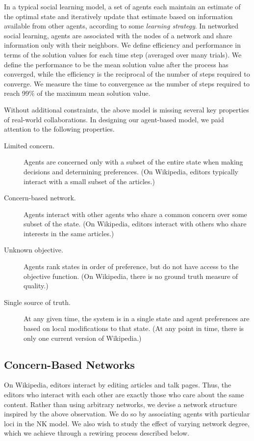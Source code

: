 In a typical social learning model,
a set of agents each maintain an estimate of the optimal state
and iteratively update that estimate based on information available from other agents,
according to some {\em learning strategy}.
In networked social learning,
agents are associated with the nodes of a network and share information
only with their neighbors.
We define efficiency and performance in terms of the solution values for each time step
(averaged over many trials).
We define the performance to be the mean solution value after the process has converged,
while the efficiency is the reciprocal of the number of steps required to converge.
We measure the time to convergence as the number of steps required to reach 99\% of the maximum
mean solution value.

Without additional constraints,
the above model is missing
several key properties of real-world collaborations.
In designing our agent-based model, we paid attention to the
following properties.
\begin{description}
\item[Limited concern.] Agents are concerned only with a subset of the entire
state when making decisions and determining preferences.
(On Wikipedia, editors typically interact with a small subset of the articles.)
\item[Concern-based network.] Agents interact with other agents who share a
common concern over some subset of the state.
(On Wikipedia, editors interact with others who share interests in the same articles.)
\item[Unknown objective.] Agents rank states in order of preference,
but do not have access to the objective function.
(On Wikipedia, there is no ground truth measure of quality.)
\item[Single source of truth.] At any given time, the system is in a single state
and agent preferences are based on local modifications to that state.
(At any point in time, there is only one current version of Wikipedia.)
\end{description}

\subsection{Concern-Based Networks}

On Wikipedia, editors interact by editing articles and talk pages.
Thus, the editors who interact with each other are exactly those who care about the same content.
Rather than using arbitrary networks,
we devise a network structure inspired by the above observation.
We do so by associating agents with particular loci in the NK model.
We also wish to study the effect of varying network degree,
which we achieve through a rewiring process described below.

